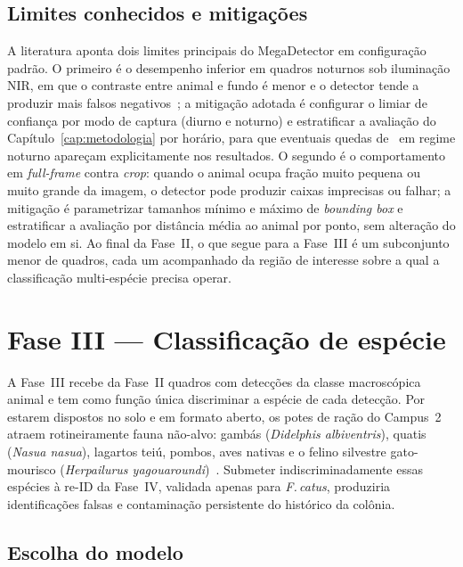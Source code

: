 \subsection*{Limites conhecidos e mitigações}

A literatura aponta dois limites principais do MegaDetector em configuração padrão. O primeiro é o desempenho inferior em quadros noturnos sob iluminação NIR, em que o contraste entre animal e fundo é menor e o detector tende a produzir mais falsos negativos~\cite{velasco2024smartcameratraps,mulero2025addressing}; a mitigação adotada é configurar o limiar de confiança por modo de captura (diurno e noturno) e estratificar a avaliação do Capítulo~\ref{cap:metodologia} por horário, para que eventuais quedas de \mAP\ em regime noturno apareçam explicitamente nos resultados. O segundo é o comportamento em \textit{full-frame} contra \textit{crop}: quando o animal ocupa fração muito pequena ou muito grande da imagem, o detector pode produzir caixas imprecisas ou falhar; a mitigação é parametrizar tamanhos mínimo e máximo de \textit{bounding box} e estratificar a avaliação por distância média ao animal por ponto, sem alteração do modelo em si. Ao final da Fase~II, o que segue para a Fase~III é um subconjunto menor de quadros, cada um acompanhado da região de interesse sobre a qual a classificação multi-espécie precisa operar.

\section{Fase III --- Classificação de espécie}
\label{sec:pipeline-fase3}

A Fase~III recebe da Fase~II quadros com detecções da classe macroscópica animal e tem como função única discriminar a espécie de cada detecção. Por estarem dispostos no solo e em formato aberto, os potes de ração do Campus~2 atraem rotineiramente fauna não-alvo: gambás (\textit{Didelphis albiventris}), quatis (\textit{Nasua nasua}), lagartos teiú, pombos, aves nativas e o felino silvestre gato-mourisco (\textit{Herpailurus yagouaroundi})~\cite{goncalves2025wildcat,cove2022capital}. Submeter indiscriminadamente essas espécies à re-ID da Fase~IV, validada apenas para \textit{F.\,catus}, produziria identificações falsas e contaminação persistente do histórico da colônia.

\subsection*{Escolha do modelo}

